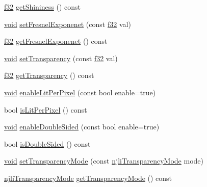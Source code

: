 \begin{DoxyCompactItemize}
\item 
\mbox{\hyperlink{_util_8h_a5f6906312a689f27d70e9d086649d3fd}{f32}} \mbox{\hyperlink{classnjli_1_1_material_aae200625d8caa2c551beca640945249a}{get\+Shininess}} () const
\item 
\mbox{\hyperlink{_thread_8h_af1e856da2e658414cb2456cb6f7ebc66}{void}} \mbox{\hyperlink{classnjli_1_1_material_a8f725eb3d8e586c3f8e02c51cfd8bb42}{set\+Fresnel\+Exponenet}} (const \mbox{\hyperlink{_util_8h_a5f6906312a689f27d70e9d086649d3fd}{f32}} val)
\item 
\mbox{\hyperlink{_util_8h_a5f6906312a689f27d70e9d086649d3fd}{f32}} \mbox{\hyperlink{classnjli_1_1_material_a39a624518fbe4e029918ed855adf3aea}{get\+Fresnel\+Exponenet}} () const
\item 
\mbox{\hyperlink{_thread_8h_af1e856da2e658414cb2456cb6f7ebc66}{void}} \mbox{\hyperlink{classnjli_1_1_material_a1082fa0725cabeb9b824d9ced36e2c69}{set\+Transparency}} (const \mbox{\hyperlink{_util_8h_a5f6906312a689f27d70e9d086649d3fd}{f32}} val)
\item 
\mbox{\hyperlink{_util_8h_a5f6906312a689f27d70e9d086649d3fd}{f32}} \mbox{\hyperlink{classnjli_1_1_material_aea9acf595dbc594ec215c9c42842e79c}{get\+Transparency}} () const
\item 
\mbox{\hyperlink{_thread_8h_af1e856da2e658414cb2456cb6f7ebc66}{void}} \mbox{\hyperlink{classnjli_1_1_material_adeafc9c196919b3936e9a4cac979b8b5}{enable\+Lit\+Per\+Pixel}} (const bool enable=true)
\item 
bool \mbox{\hyperlink{classnjli_1_1_material_ad21ee1c7e0de8c532f3bd8bf0314d5d1}{is\+Lit\+Per\+Pixel}} () const
\item 
\mbox{\hyperlink{_thread_8h_af1e856da2e658414cb2456cb6f7ebc66}{void}} \mbox{\hyperlink{classnjli_1_1_material_a637971ef59e44b54f49522882f6b1c67}{enable\+Double\+Sided}} (const bool enable=true)
\item 
bool \mbox{\hyperlink{classnjli_1_1_material_a8b9cd58b0b79154a5d4a813d86d91417}{is\+Double\+Sided}} () const
\item 
\mbox{\hyperlink{_thread_8h_af1e856da2e658414cb2456cb6f7ebc66}{void}} \mbox{\hyperlink{classnjli_1_1_material_adfa835da63d259e393f16edf5e7e589a}{set\+Transparency\+Mode}} (const \mbox{\hyperlink{namespacenjli_ae6563db51402a0e02a3e55ef556afdd9}{njli\+Transparency\+Mode}} mode)
\item 
\mbox{\hyperlink{namespacenjli_ae6563db51402a0e02a3e55ef556afdd9}{njli\+Transparency\+Mode}} \mbox{\hyperlink{classnjli_1_1_material_a0b8c45cc2da094f6c0cb89fe3e597ec8}{get\+Transparency\+Mode}} () const

\end{DoxyCompactItemize}
